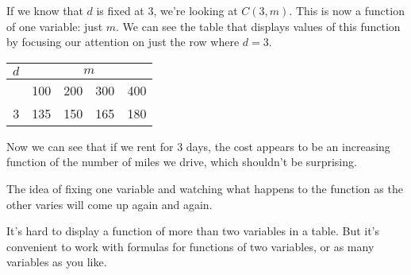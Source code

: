 \begin{example}
\begin{enumerate}[label=(\alph*)]
    \begin{solution} 
If we know that $d$ is fixed at 3, we're looking at $C(3,m)$. This is now a function of one variable: just $m$. We can see the table that displays values of this function by focusing our attention on just the row where $d=3$.
\begin{table}[ht!]
\centering
    \begin{tabular}{*{5}{c}}
    $d$ & \multicolumn{4}{c}{$m$} \\
    \toprule
        & 100 & 200 & 300 & 400\\
    \midrule
    3   & 135 & 150 & 165 & 180\\
    \bottomrule
    \end{tabular}
\end{table}
Now we can see that if we rent for 3 days, the cost appears to be an increasing function of the number of miles we drive, which shouldn't be surprising.
    \end{solution}
\end{enumerate}
\end{example}

The idea of fixing one variable and watching what happens to the function as the other varies will come up again and again.

It's hard to display a function of more than two variables in a table. But it's convenient to work with formulas for functions of two variables, or as many variables as you like.

